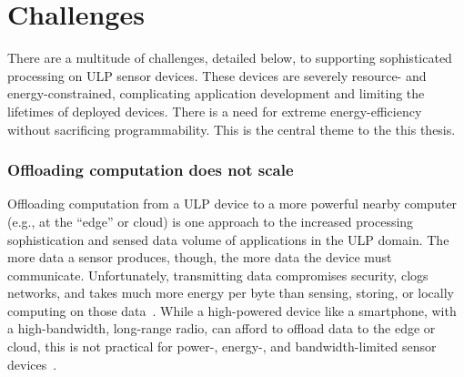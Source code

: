 
\section{Challenges}
There are a multitude of challenges, detailed below, to supporting sophisticated processing on ULP sensor devices.
% 
These devices are severely resource- and energy-constrained, complicating application development and limiting the lifetimes of deployed devices.
% 
There is a need for extreme energy-efficiency without sacrificing programmability.
% 
This is the central theme to the this thesis.

\subsubsection{Offloading computation does not scale}
Offloading computation from a ULP device to a more powerful nearby computer (e.g., at the ``edge'' or cloud) is one approach to the increased processing sophistication and sensed data volume of applications in the ULP domain.
%
The more data a sensor produces, though, the more data the device must
communicate.
%
Unfortunately, transmitting data compromises security, clogs networks, and takes much more energy per byte than
sensing, storing, or locally computing on those data~\cite{sonic,zebranet}.  
%
While a high-powered device like a smartphone, with a high-bandwidth,
long-range radio, can afford to offload data to the edge or cloud,
this is not practical for power-, energy-, and bandwidth-limited sensor devices~\cite{dongare2017openchirp,sonic}.

